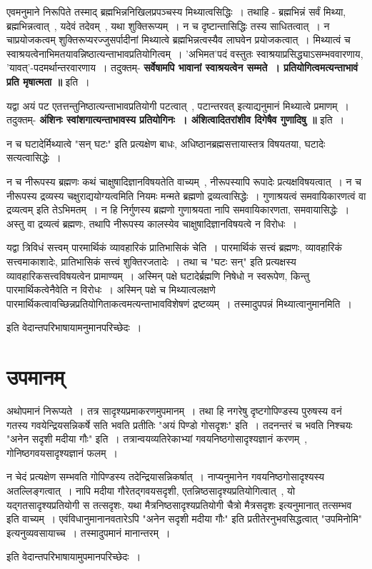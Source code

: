	एवमनुमाने निरूपिते तस्माद् ब्रह्मभिन्ननिखिलप्रपञ्चस्य मिथ्यात्वसिद्धिः~। तथाहि - ब्रह्मभिन्नं सर्वं मिथ्या, ब्रह्मभिन्नत्वात्~, यदेवं तदेवम्~, यथा शुक्तिरूप्यम्~। न च दृष्टान्तासिद्धिः तस्य साधितत्वात्~। न चाप्रयोजकत्वम् शुक्तिरूप्यरज्जुसर्पादीनां मिथ्यात्वे ब्रह्मभिन्नत्वस्यैव लाघवेन प्रयोजकत्वात्~। मिथ्यात्वं च स्वाश्रयत्वेनाभिमतयावन्निष्ठात्यन्ताभावप्रतियोगित्वम्~। 'अभिमत'पदं वस्तुतः स्वाश्रयाप्रसिद्ध्याऽसम्भववारणाय, 'यावत्'-पदमर्थान्तरवारणाय~। तदुक्तम्- {\bfseries सर्वेषामपि भावानां स्वाश्रयत्वेन सम्मते~। प्रतियोगित्वमत्यन्ताभावं प्रति मृषात्मता ॥} इति~। \par
	यद्वा अयं पट एतत्तन्तुनिष्ठात्यन्ताभावप्रतियोगी पटत्वात्~, पटान्तरवत् इत्याद्यनुमानं मिथ्यात्वे प्रमाणम्~। तदुक्तम्- {\bfseries अंशिनः स्वांशगात्यन्ताभावस्य प्रतियोगिनः~। अंशित्वादितरांशीव दिगेषैव गुणादिषु ॥} इति~।  \par
	न च घटादेर्मिथ्यात्वे "सन् घटः" इति प्रत्यक्षेण बाधः, अधिष्ठानब्रह्मसत्तायास्तत्र विषयतया, घटादेः सत्यत्वासिद्धेः~।\par
	न च नीरूपस्य ब्रह्मणः कथं चाक्षुषादिज्ञानविषयतेति वाच्यम्~, नीरूपस्यापि रूपादेः प्रत्यक्षविषयत्वात्~। न च नीरूपस्य द्रव्यस्य चक्षुराद्ययोग्यत्वमिति नियमः मन्मते ब्रह्मणो द्रव्यत्वासिद्धेः~। गुणाश्रयत्वं समवायिकारणत्वं वा द्रव्यत्वम् इति तेऽभिमतम्~। न हि निर्गुणस्य ब्रह्मणो गुणाश्रयता नापि समवायिकारणता, समवायासिद्धेः~। अस्तु वा द्रव्यत्वं ब्रह्मणः, तथापि नीरूपस्य कालस्येव चाक्षुषादिज्ञानविषयत्वे न विरोधः~।\par
	यद्वा त्रिविधं सत्त्वम् पारमार्थिकं व्यावहारिकं प्रातिभासिकं चेति~। पारमार्थिकं सत्त्वं ब्रह्मणः, व्यावहारिकं सत्त्वमाकाशादेः, प्रातिभासिकं सत्त्वं शुक्तिरजतादेः~। तथा च "घटः सन्" इति प्रत्यक्षस्य व्यावहारिकसत्त्वविषयत्वेन प्रामाण्यम्~। अस्मिन् पक्षे घटादेर्ब्रह्मणि निषेधो न स्वरूपेण, किन्तु पारमार्थिकत्वेनैवेति न विरोधः~। अस्मिन् पक्षे च मिथ्यात्वलक्षणे पारमार्थिकत्वावच्छिन्नप्रतियोगिताकत्वमत्यन्ताभावविशेषणं द्रष्टव्यम्~। तस्मादुपपन्नं मिथ्यात्वानुमानमिति~।
	\begin{center} इति वेदान्तपरिभाषायामनुमानपरिच्छेदः~।\end{center} 
\section{उपमानम्}\par
	अथोपमानं निरूप्यते~। तत्र सादृश्यप्रमाकरणमुपमानम्~। तथा हि नगरेषु दृष्टगोपिण्डस्य पुरुषस्य वनं गतस्य गवयेन्द्रियसन्निकर्षे सति भवति प्रतीतिः "अयं पिण्डो गोसदृशः" इति~। तदनन्तरं च भवति निश्चयः "अनेन सदृशी मदीया गौः" इति~। तत्रान्वयव्यतिरेकाभ्यां गवयनिष्ठगोसादृश्यज्ञानं करणम्~, गोनिष्ठगवयसादृश्यज्ञानं फलम्~।\par
	न चेदं प्रत्यक्षेण सम्भवति गोपिण्डस्य तदेन्द्रियासन्निकर्षात्~। नाप्यनुमानेन गवयनिष्ठगोसादृश्यस्य अतल्लिङ्गत्वात्~। नापि मदीया गौरेतद्गवयसदृशी, एतन्निष्ठसादृश्यप्रतियोगित्वात्~, यो यद्गतसादृश्यप्रतियोगी स तत्सदृशः, यथा मैत्रनिष्ठसादृश्यप्रतियोगी चैत्रो मैत्रसदृशः इत्यनुमानात् तत्सम्भव इति वाच्यम्~। एवंविधानुमानानवतारेऽपि "अनेन सदृशी मदीया गौः" इति प्रतीतेरनुभवसिद्धत्वात् "उपमिनोमि" इत्यनुव्यवसायाच्च~। तस्मादुपमानं मानान्तरम्~।\\
	\begin{center} इति वेदान्तपरिभाषायामुपमानपरिच्छेदः~।\end{center} 
